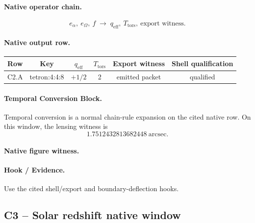 \paragraph{Native operator chain.}
\[
e_\alpha,\ e_\Omega,\ f
\;\to\;
q_{\mathrm{eff}},\ T_{\mathrm{tors}},\ \text{export witness}.
\]
\paragraph{Native output row.}
\begin{center}
\small
\begin{tabular}{lccccc}
\toprule
Row & Key & $q_{\mathrm{eff}}$ & $T_{\mathrm{tors}}$ & Export witness & Shell qualification \\
\midrule
C2.A & tetron:4:4:8 & $+1/2$ & 2 & emitted packet & qualified \\
\bottomrule
\end{tabular}
\end{center}
\paragraph{Temporal Conversion Block.} Temporal conversion is a normal chain-rule expansion on the cited native row. On this window, the lensing witness is
\[
1.7512432813682448\ \text{arcsec}.
\]
\paragraph{Native figure witness.}
\begin{center}
\end{center}
\paragraph{Hook / Evidence.} Use the cited shell/export and boundary-deflection hooks.


\subsection{C3 -- Solar redshift native window}\label{app:c3}
